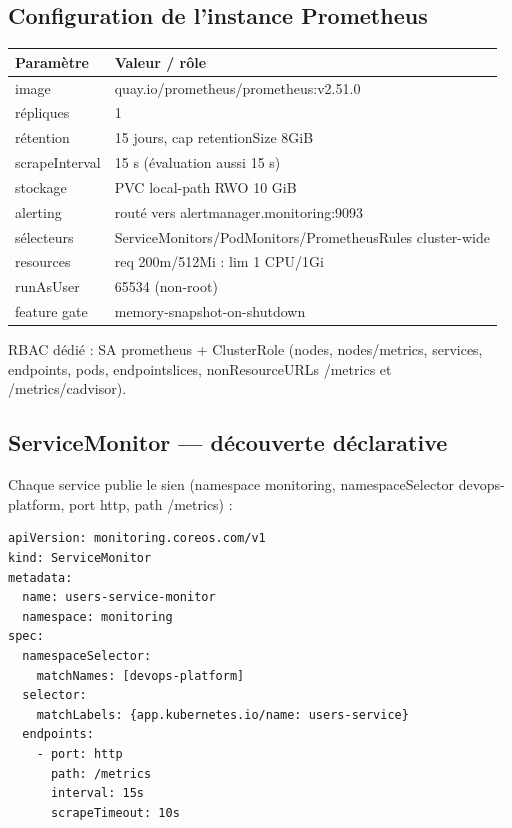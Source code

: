 \documentclass[12pt,a4paper,twoside,openright]{report}
\begin{document}
\subsection{Configuration de l'instance Prometheus}
\begin{center}\label{tab:ch-prometheus-operator-configuration-de-l-instance-}\end{center}
\begin{longtable}{@{}p{4.6cm}p{9.6cm}@{}}
\toprule
\textbf{Paramètre} & \textbf{Valeur / rôle} \\
\midrule
\endhead
image & quay.io/prometheus/prometheus:v2.51.0 \\
répliques & 1 \\
rétention & 15 jours, cap retentionSize 8GiB \\
scrapeInterval & 15 s (évaluation aussi 15 s) \\
stockage & PVC local-path RWO 10 GiB \\
alerting & routé vers alertmanager.monitoring:9093 \\
sélecteurs & ServiceMonitors/PodMonitors/PrometheusRules cluster-wide \\
resources & req 200m/512Mi : lim 1 CPU/1Gi \\
runAsUser & 65534 (non-root) \\
feature gate & memory-snapshot-on-shutdown \\
\bottomrule
\end{longtable}

RBAC dédié : SA prometheus + ClusterRole (nodes, nodes/metrics, services, endpoints, pods, endpointslices, nonResourceURLs /metrics et /metrics/cadvisor).

\subsection{ServiceMonitor --- découverte déclarative}
Chaque service publie le sien (namespace monitoring, namespaceSelector devops-platform, port http, path /metrics) :
\begin{lstlisting}[caption={ServiceMonitor : intervalle 15 s aligné sur Prometheus}]
apiVersion: monitoring.coreos.com/v1
kind: ServiceMonitor
metadata:
  name: users-service-monitor
  namespace: monitoring
spec:
  namespaceSelector:
    matchNames: [devops-platform]
  selector:
    matchLabels: {app.kubernetes.io/name: users-service}
  endpoints:
    - port: http
      path: /metrics
      interval: 15s
      scrapeTimeout: 10s
\end{lstlisting}
\end{document}
